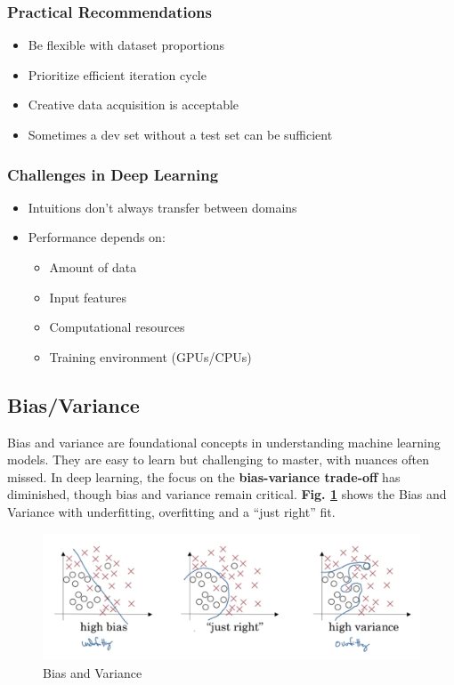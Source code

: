 \documentclass[letterpaper,12pt,notitlepage,twoside]{report}
\begin{document}
\subsubsection{Practical Recommendations}
\begin{itemize}[leftmargin=*,  nosep]
    \item Be flexible with dataset proportions
    \item Prioritize efficient iteration cycle
    \item Creative data acquisition is acceptable
    \item Sometimes a dev set without a test set can be sufficient
\end{itemize}

\subsubsection{Challenges in Deep Learning}
\begin{itemize}[leftmargin=*,  nosep]
    \item Intuitions don't always transfer between domains
    \item Performance depends on:
    \begin{itemize}[nosep]
        \item Amount of data
        \item Input features
        \item Computational resources
        \item Training environment (GPUs/CPUs)
    \end{itemize}
\end{itemize}

\subsection*{Bias/Variance}
Bias and variance are foundational concepts in understanding machine learning models. They are easy to learn but challenging to master, with nuances often missed. In deep learning, the focus on the \textbf{bias-variance trade-off} has diminished, though bias and variance remain critical.
\textbf{Fig. \ref{fig:17}} shows the Bias and Variance with underfitting, overfitting and a ``just right'' fit.
\begin{figure}[h]
	\centering
	\includegraphics[width=\textwidth]{Images/Bias-Variance.png}
	\caption{Bias and Variance}
	\label{fig:17}
\end{figure}
\FloatBarrier
\end{document}
